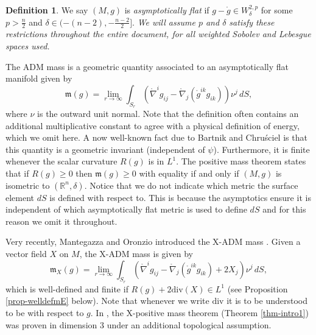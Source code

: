 \documentclass[a4paper,11pt,reqno]{amsart}
\theoremstyle{plain}
\theoremstyle{definition}
\newtheorem{defn}[thm]{Definition}
\theoremstyle{remark}
\newcommand{\m}{\mathfrak{m}}
\def\onabla{\mathring \nabla}
\numberwithin{equation}{section}
\begin{document}
\begin{defn}\label{def-AF}
	We say $(M,g)$ is \textit{asymptotically flat} if $g-\mathring{g}\in W^{2,p}_\delta$ for some $p>\frac{n}{2}$ and $\delta\in(-(n-2),-\frac{n-2}{2}]$. \textit{We will assume $p$ and $\delta$ satisfy these restrictions throughout the entire document, for all weighted Sobolev and Lebesgue spaces used.}
\end{defn}

The ADM mass is a geometric quantity associated to an asymptotically flat manifold given by
\begin{equation}\label{eq-ADMdefn}
	\m(g)=\lim_{r\to\infty} \int_{S_r}\left( \onabla^ig_{ij}-\onabla_j(\mathring g^{ik}g_{ik})\right)\nu^j\,dS,
\end{equation}
where $\nu$ is the outward unit normal. Note that the definition often contains an additional multiplicative constant to agree with a physical definition of energy, which we omit here. A now well-known fact due to Bartnik \cite{Bartnik86} and Chru\'sciel \cite{Chrusciel1986} is that this quantity is a geometric invariant (independent of $\psi$). Furthermore, it is finite whenever the scalar curvature $R(g)$ is in $L^1$. The positive mass theorem states that if $R(g)\geq0$ then $\m(g)\geq0$ with equality if and only if $(M,g)$ is isometric to $(\mathbb R^n,\delta)$. Notice that we do not indicate which metric the surface element $dS$ is defined with respect to. This is because the asymptotics ensure it is independent of which asymptotically flat metric is used to define $dS$ and for this reason we omit it throughout.


Very recently, Mantegazza and Oronzio introduced the X-ADM mass \cite{MantegazzaOronzio2026XADM}. Given a vector field $X$ on $M$, the X-ADM mass is given by
\begin{equation}
	\m_X(g)=\lim_{r\to \infty}\int_{S_r} \left(\onabla^i g_{ij}-\onabla_j(\mathring{g}^{ik}g_{ik})+2X_j\right)\nu^j\,dS,
\end{equation}
which is well-defined and finite if $R(g)+2\mathrm{div}(X)\in L^1$ (see Proposition \ref{prop-welldefmE} below). Note that whenever we write $\mathrm{div}$ it is to be understood to be with respect to $g$. In \cite{MantegazzaOronzio2026XADM}, the X-positive mass theorem (Theorem \ref{thm-intro1}) was proven in dimension $3$ under an additional topological assumption.
\end{document}
